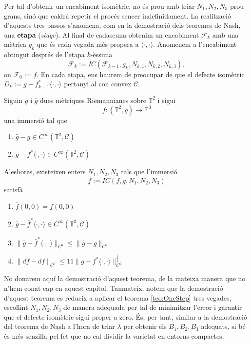 Per tal d'obtenir un encabiment isomètric, no és prou amb triar $N_1, N_2, N_3$ prou grans, sinó que caldrà repetir el procés sencer indefinidament. La realització d'aquests tres passos s'anomena, com en la demostració dels teoremes de Nash, una \textbf{etapa} (\textit{stage}). Al final de cadascuna obtenim un encabiment $\mathcal F_k$ amb una mètrica $g_k$ que és cada vegada més propera a $\langle\cdot, \cdot\rangle$. Anomenem a l'encabiment obtingut després de l'etapa $k$-èssima 
\begin{equation*}
    \mathcal F_k:=IC(\mathcal F_{k-1}, g_k, N_{k,1}, N_{k,2}, N_{k,3}),
\end{equation*}
on $\mathcal F_0:=f$. En cada etapa, ens haurem de preocupar de que el defecte isomètric $D_k:=g-f_{k-1}^*\langle\cdot, \cdot\rangle$ pertanyi al con convex $\mathcal C$.

\begin{teo}\label{teo:Stage}
    Siguin $g$ i $\bar g$ dues mètriques Riemannianes sobre $\mathbb T^2$ i sigui 
    \begin{equation*}
        f:(\mathbb T^2, g)\to\mathbb E^3
    \end{equation*}
    una immersió tal que
    \begin{enumerate}
        \item $\bar g - g\in C^\infty(\mathbb T^2, \mathcal C)$
        \item $g-f^*\langle\cdot, \cdot\rangle\in C^\infty(\mathbb T^2, \mathcal C)$
    \end{enumerate}
    Aleshores, existeixen enters $N_1, N_2, N_3$ tals que l'immersió
    \begin{equation*}
        \bar f:=IC(f, g, N_1, N_2, N_3)
    \end{equation*}
    satisfà
    \begin{enumerate}
        \item $\bar f(0,0) = f(0,0)$
        \item $\bar g - \bar f^*\langle\cdot, \cdot\rangle\in C^\infty(\mathbb T^2, \mathcal C)$
        \item $\|\bar g - \bar f^*\langle\cdot, \cdot\rangle\|_{C^0}\le \|\bar g - g\|_{C^0}$
        \item $\|d\bar f - df\|_{C^0}\le11\|g-f^*\langle\cdot, \cdot\rangle\|_{C^0}^{\frac{1}{2}}$
    \end{enumerate}
\end{teo}

\begin{obs}
    No donarem aquí la demostració d'aquest teorema, de la mateixa manera que no n'hem conat cap en aquest capítol. Tanmateix, notem que la demostració d'aquest teorema es redueix a aplicar el teorema \ref{teo:OneStep} tres vegades, escollint $N_1, N_2, N_3$ de manera adequada per tal de minimitzar l'error i garantir que el defecte isomètric sigui proper a zero. És, per tant, similar a la demostració del teorema de Nash a l'hora de triar $\lambda$ per obtenir els $B_1, B_2, B_3$ adequats, si bé és més senzilla pel fet que no cal dividir la varietat en entorns compactes.
\end{obs}

